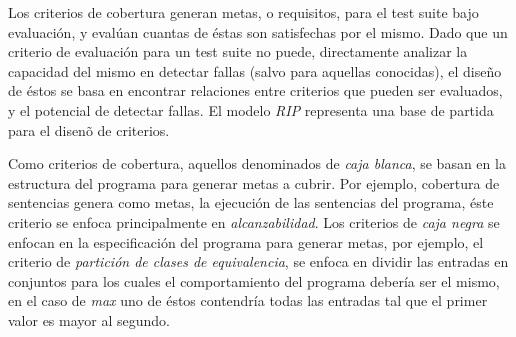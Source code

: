Los criterios de cobertura generan metas, o requisitos, para el test suite bajo evaluaci\'on, y eval\'uan cuantas de \'estas son satisfechas por el mismo. Dado que un criterio de evaluaci\'on para un test suite no puede, directamente analizar la capacidad del mismo en detectar fallas (salvo para aquellas conocidas), el dise\~no de \'estos se basa en encontrar relaciones entre criterios que pueden ser evaluados, y el potencial de detectar fallas. El modelo \emph{RIP} representa una base de partida para el disen\~o de criterios.

Como criterios de cobertura, aquellos denominados de \emph{caja blanca}, se basan en la estructura del programa para generar metas a cubrir. Por ejemplo, cobertura de sentencias genera como metas, la ejecuci\'on de las sentencias del programa, \'este criterio se enfoca principalmente en \emph{alcanzabilidad}. Los criterios de \emph{caja negra} se enfocan en la especificaci\'on del programa para generar metas, por ejemplo, el criterio de \emph{partici\'on de clases de equivalencia}, se enfoca en dividir las entradas en conjuntos para los cuales el comportamiento del programa deber\'ia ser el mismo, en el caso de \emph{max} uno de \'estos contendr\'ia todas las entradas tal que el primer valor es mayor al segundo.

